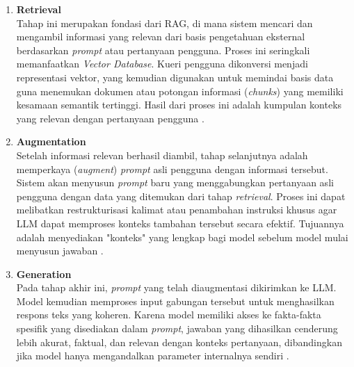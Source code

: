 \begin{enumerate}
    \item \textbf{Retrieval} \\
    Tahap ini merupakan fondasi dari RAG, di mana sistem mencari dan mengambil informasi yang relevan dari basis pengetahuan eksternal berdasarkan \textit{prompt} atau pertanyaan pengguna. Proses ini seringkali memanfaatkan \textit{Vector Database}. Kueri pengguna dikonversi menjadi representasi vektor, yang kemudian digunakan untuk memindai basis data guna menemukan dokumen atau potongan informasi (\textit{chunks}) yang memiliki kesamaan semantik tertinggi. Hasil dari proses ini adalah kumpulan konteks yang relevan dengan pertanyaan pengguna \parencite{Karpukhin2020Dense}.
    
    \item \textbf{Augmentation} \\
    Setelah informasi relevan berhasil diambil, tahap selanjutnya adalah memperkaya (\textit{augment}) \textit{prompt} asli pengguna dengan informasi tersebut. Sistem akan menyusun \textit{prompt} baru yang menggabungkan pertanyaan asli pengguna dengan data yang ditemukan dari tahap \textit{retrieval}. Proses ini dapat melibatkan restrukturisasi kalimat atau penambahan instruksi khusus agar LLM dapat memproses konteks tambahan tersebut secara efektif. Tujuannya adalah menyediakan "konteks" yang lengkap bagi model sebelum model mulai menyusun jawaban \parencite{Lewis2020Retrieval}.
    
    \item \textbf{Generation} \\
    Pada tahap akhir ini, \textit{prompt} yang telah diaugmentasi dikirimkan ke LLM. Model kemudian memproses input gabungan tersebut untuk menghasilkan respons teks yang koheren. Karena model memiliki akses ke fakta-fakta spesifik yang disediakan dalam \textit{prompt}, jawaban yang dihasilkan cenderung lebih akurat, faktual, dan relevan dengan konteks pertanyaan, dibandingkan jika model hanya mengandalkan parameter internalnya sendiri \parencite{Shuster2021Retrieval}.
\end{enumerate}

